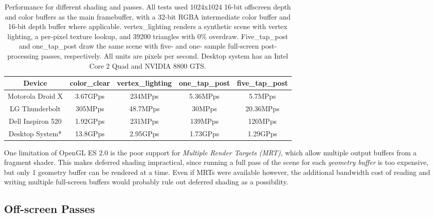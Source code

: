 \begin{table}[htb]\centering \begin{tabular}{|c||c|c|c|c|} 
\hline \small{Device} & \small{color\_clear} & \small{vertex\_lighting} & \small{one\_tap\_post} & \small{five\_tap\_post}  \\ \hline 
\hline \small{Motorola Droid X} & \small{3.67GPps} & \small{234MPps}& \small{5.36MPps\footnotemark[1]} & \small{5.7MPps\footnotemark[1]} \\ 
\hline \small{LG Thunderbolt} & \small{305MPps} & \small{48.7MPps}& \small{30MPps} & \small{20.36MPps} \\ 
\hline \small{Dell Inspiron 520} & \small{1.92GPps} & \small{231MPps}& \small{139MPps} & \small{120MPps} \\ 
\hline \small{Desktop System*} & \small{13.8GPps} & \small{2.95GPps}& \small{1.73GPps} & \small{1.29GPps} \\ 
\end{tabular} 
\caption{Performance for different shading and passes.  All tests used 1024x1024 16-bit offscreen depth and color buffers as the main framebuffer, with a 32-bit RGBA intermediate color buffer and 16-bit depth buffer where applicable.  vertex\_lighting renders a synthetic scene with vertex lighting, a per-pixel texture lookup, and 39200 triangles with 0\% overdraw.  Five\_tap\_post and one\_tap\_post draw the same scene with five- and one- sample full-screen post-processing passes, respectively.  All units are pixels per second.  Desktop system has an Intel Core 2 Quad and NVIDIA 8800 GTS.}
\label{JonMcCaffrey:pass_performance} \end{table}


One limitation of OpenGL ES 2.0 is the poor support for \textit{Multiple Render
Targets (MRT)}, which allow multiple output buffers from a fragment shader.
This makes deferred shading impractical, since running a full pass of the
scene for each \textit{geometry buffer} is too expensive, but only 1 geometry
buffer can be rendered at a time.  Even if MRTs were available however, the
additional bandwidth cost of reading and writing multiple full-screen buffers
would probably rule out deferred shading as a possibility.

\subsection{Off-screen Passes}
\label{Jon-McCaffrey-Off-Screen-Pass}

